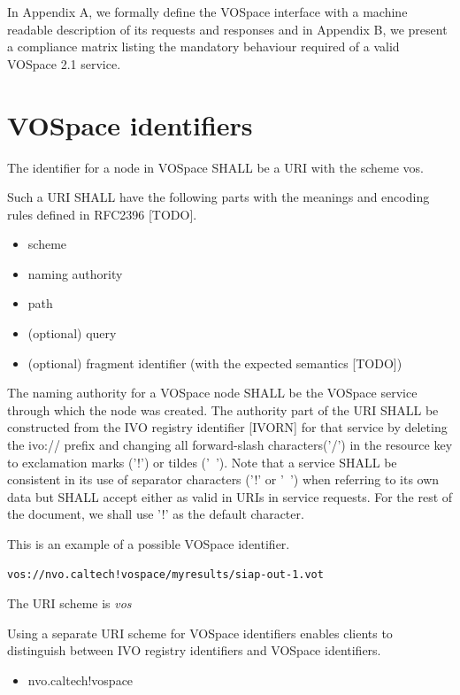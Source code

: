 \documentclass[11pt,a4paper]{ivoa}
\begin{document}
In Appendix A, we formally define the VOSpace interface with a machine readable description of its requests and responses and in Appendix B, we present a compliance matrix listing the mandatory behaviour required of a valid VOSpace 2.1 service.

\section{VOSpace identifiers}
The identifier for a node in VOSpace SHALL be a URI with the scheme vos.

Such a URI SHALL have the following parts with the meanings and encoding rules defined in RFC2396 [TODO].

\begin{itemize}
  \item scheme
  \item naming authority
  \item path
  \item (optional) query
  \item (optional) fragment identifier (with the expected semantics [TODO])
\end{itemize}

The naming authority for a VOSpace node SHALL be the VOSpace service through which the node was created. The authority part of the URI SHALL be constructed from the IVO registry identifier [IVORN] for that service by deleting the ivo:// prefix and changing all forward-slash characters('/') in the resource key to exclamation marks ('!') or tildes ('~'). Note that a service SHALL be consistent in its use of separator characters ('!' or '~') when referring to its own data but SHALL accept either as valid in URIs in service requests. For the rest of the document, we shall use '!' as the default character.

This is an example of a possible VOSpace identifier.

\begin{lstlisting}
vos://nvo.caltech!vospace/myresults/siap-out-1.vot
\end{lstlisting}

The URI scheme is \emph{vos}

Using a separate URI scheme for VOSpace identifiers enables clients to distinguish between IVO registry identifiers and VOSpace identifiers.

\begin{itemize}
    \item nvo.caltech!vospace
\end{itemize}
\end{document}
